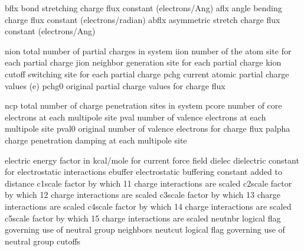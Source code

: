 \documentclass[letterpaper,11pt,english]{sphinxmanual}
\begin{document}
\sphinxAtStartPar
{}

\begin{sphinxVerbatim}[commandchars=\\\{\}]
bflx            bond stretching charge flux constant (electrons/Ang)
aflx            angle bending charge flux constant (electrons/radian)
abflx           asymmetric stretch charge flux constant (electrons/Ang)
\end{sphinxVerbatim}

\sphinxAtStartPar
{}

\begin{sphinxVerbatim}[commandchars=\\\{\}]
nion            total number of partial charges in system
iion            number of the atom site for each partial charge
jion            neighbor generation site for each partial charge
kion            cutoff switching site for each partial charge
pchg            current atomic partial charge values (e\PYGZhy{})
pchg0           original partial charge values for charge flux
\end{sphinxVerbatim}

\sphinxAtStartPar
{}

\begin{sphinxVerbatim}[commandchars=\\\{\}]
ncp             total number of charge penetration sites in system
pcore           number of core electrons at each multipole site
pval            number of valence electrons at each multipole site
pval0           original number of valence electrons for charge flux
palpha          charge penetration damping at each multipole site
\end{sphinxVerbatim}

\sphinxAtStartPar
{}

\begin{sphinxVerbatim}[commandchars=\\\{\}]
electric        energy factor in kcal/mole for current force field
dielec          dielectric constant for electrostatic interactions
ebuffer         electrostatic buffering constant added to distance
c1scale         factor by which 1\PYGZhy{}1 charge interactions are scaled
c2scale         factor by which 1\PYGZhy{}2 charge interactions are scaled
c3scale         factor by which 1\PYGZhy{}3 charge interactions are scaled
c4scale         factor by which 1\PYGZhy{}4 charge interactions are scaled
c5scale         factor by which 1\PYGZhy{}5 charge interactions are scaled
neutnbr         logical flag governing use of neutral group neighbors
neutcut         logical flag governing use of neutral group cutoffs
\end{sphinxVerbatim}
\end{document}
